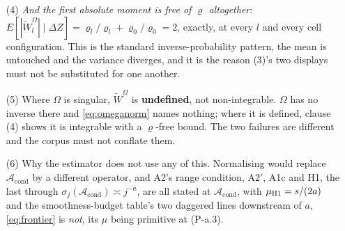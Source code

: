 \begin{remark}
\begin{enumerate}
{second is not controlled by the level bound}, exceeding it here by a factor of $1.79$. Under A4(i) it is
at most $2(\mathsf L-1)/\varepsilon_\varrho$, so the \emph{worst case} is a factor $2(\mathsf L-1)$, 
$6$ at $\mathsf L=4$, which the configuration above does not attain.
\item[(4)] \emph{And the first absolute moment is free of $\varrho$ altogether}:
$E[|\widetilde W^{\Omega}_l|\mid\Delta Z]=\varrho_l/\varrho_l+\varrho_0/\varrho_0=2$, exactly, at every
$l$ and every cell configuration. This is the standard inverse-probability pattern, the mean is
untouched and the variance diverges, and it is the reason (3)'s two displays must not be substituted
for one another.
\item[(5)] Where $\Omega$ is singular, $\widetilde W^{\Omega}$ is \textbf{undefined}, not
non-integrable. $\Omega$ has no inverse there and \eqref{eq:omeganorm} names nothing; where it is
defined, clause (4) shows it is integrable with a $\varrho$-free bound. The two failures are
different and the corpus must not conflate them.
\item[(6)] Why the estimator does not use any of this. Normalising would replace
$\mathcal A_{\mathrm{cond}}$ by a different operator, and A2's range condition, A$2'$, A1c and H1, 
the last through $\sigma_j(\mathcal A_{\mathrm{cond}})\asymp j^{-a}$, are all stated at
$\mathcal A_{\mathrm{cond}}$, with $\mu_{\text{\textup{H1}}}=s/(2a)$ and the smoothness-budget table's
two daggered lines downstream of $a$, \eqref{eq:frontier} is \emph{not}, its $\mu$ being primitive
at \textup{(P-a.3)}.
%

\end{enumerate}
\end{remark}
